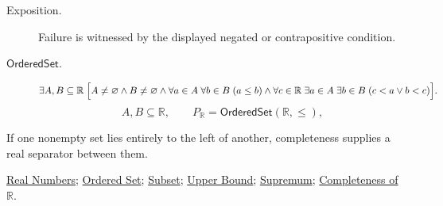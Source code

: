 \begin{remark*}
\begin{description}
  \item[Exposition.]
  Failure is witnessed by the displayed negated or contrapositive condition.

  \item[\(\mathsf{OrderedSet}.\)]
  \[
\exists A,B\subseteq\mathbb{R}\;
\Bigl[
A\ne\varnothing\land B\ne\varnothing\land
\forall a\in A\;\forall b\in B\;(a\le b)
\land
\forall c\in\mathbb{R}\;\exists a\in A\;\exists b\in B\;(c<a\lor b<c)
\Bigr].
\]
\[
A,B\subseteq\mathbb{R},\qquad P_{\mathbb{R}}=\mathsf{OrderedSet}(\mathbb{R},\leq),
\]
\end{description}
\end{remark*}
\begin{remark*}[Interpretation]
If one nonempty set lies entirely to the left of another, completeness supplies
a real separator between them.
\end{remark*}
\begin{dependencies}
\hyperref[def:reals]{Real Numbers};
\hyperref[def:ordered-set]{Ordered Set};
\hyperref[def:subset]{Subset};
\hyperref[def:real-upper-bound]{Upper Bound};
\hyperref[def:supremum]{Supremum};
\hyperref[ax:completeness-of-reals]{Completeness of $\mathbb{R}$}.
\end{dependencies}


